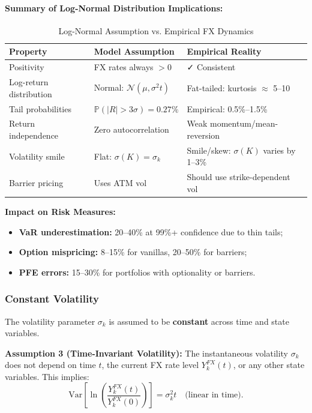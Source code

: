\paragraph{Summary of Log-Normal Distribution Implications:}

\begin{table}[h!]
	\centering
	\small
	\begin{tabular}{|p{4.5cm}|p{5cm}|p{4.5cm}|}
		\hline
		\textbf{Property} & \textbf{Model Assumption} & \textbf{Empirical Reality} \\
		\hline
		Positivity & FX rates always $> 0$ & ✓ Consistent \\
		\hline
		Log-return distribution & Normal: $\mathcal{N}(\mu, \sigma^2 t)$ & Fat-tailed: kurtosis $\approx$ 5--10 \\
		\hline
		Tail probabilities & $\mathbb{P}(|R| > 3\sigma) = 0.27\%$ & Empirical: 0.5\%--1.5\% \\
		\hline
		Return independence & Zero autocorrelation & Weak momentum/mean-reversion \\
		\hline
		Volatility smile & Flat: $\sigma(K) = \sigma_k$ & Smile/skew: $\sigma(K)$ varies by 1--3\% \\
		\hline
		Barrier pricing & Uses ATM vol & Should use strike-dependent vol \\
		\hline
	\end{tabular}
	\caption{Log-Normal Assumption vs. Empirical FX Dynamics}
\end{table}

\textbf{Impact on Risk Measures:}

\begin{itemize}
	\item \textbf{VaR underestimation:} 20--40\% at 99\%+ confidence due to thin tails;
	\item \textbf{Option mispricing:} 8--15\% for vanillas, 20--50\% for barriers;
	\item \textbf{PFE errors:} 15--30\% for portfolios with optionality or barriers.
\end{itemize}

\newpage
\subsubsection{Constant Volatility}

The volatility parameter $\sigma_k$ is assumed to be \textbf{constant} across time and state variables.

\textbf{Assumption 3 (Time-Invariant Volatility):} The instantaneous volatility $\sigma_k$ does not depend on time $t$, the current FX rate level $Y_k^{FX}(t)$, or any other state variables. This implies:
\begin{equation}
	\text{Var}\!\left[\ln\!\left(\frac{Y_k^{FX}(t)}{Y_k^{FX}(0)}\right)\right] = \sigma_k^2 t \quad \text{(linear in time)}.
\end{equation}

